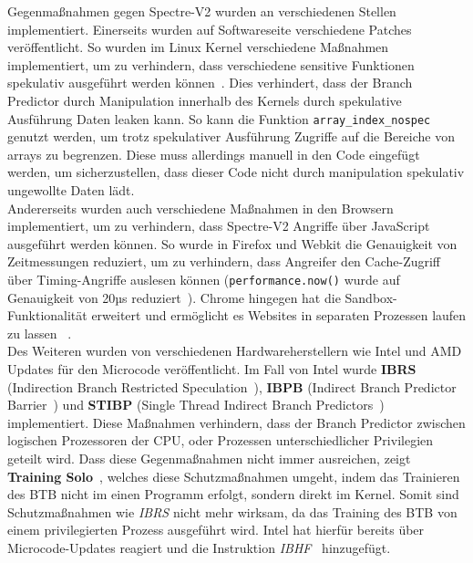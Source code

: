 Gegenmaßnahmen gegen Spectre-V2 wurden an verschiedenen Stellen implementiert.
Einerseits wurden auf Softwareseite verschiedene Patches veröffentlicht.
So wurden im Linux Kernel verschiedene Maßnahmen implementiert, um zu verhindern, dass verschiedene sensitive Funktionen spekulativ ausgeführt werden können~\cite{linux_nospec}.
Dies verhindert, dass der Branch Predictor durch Manipulation innerhalb des Kernels durch spekulative Ausführung Daten leaken kann.
So kann die Funktion \texttt{array\_index\_nospec} genutzt werden, um trotz spekulativer Ausführung Zugriffe auf die Bereiche von arrays zu begrenzen.
Diese muss allerdings manuell in den Code eingefügt werden, um sicherzustellen, dass dieser Code nicht durch manipulation spekulativ ungewollte Daten lädt.
\\
Andererseits wurden auch verschiedene Maßnahmen in den Browsern implementiert, um zu verhindern, dass Spectre-V2 Angriffe über JavaScript ausgeführt werden können.
So wurde in Firefox und Webkit die Genauigkeit von Zeitmessungen reduziert, um zu verhindern, dass Angreifer den Cache-Zugriff über Timing-Angriffe auslesen können (\texttt{performance.now()} wurde auf Genauigkeit von 20µs reduziert~\cite{luke_wagner_2018}).
Chrome hingegen hat die Sandbox-Funktionalität erweitert und ermöglicht es Websites in separaten Prozessen laufen zu lassen
~\cite{heise_2018_spec}.\\
Des Weiteren wurden von verschiedenen Hardwareherstellern wie Intel und AMD Updates für den Microcode veröffentlicht.
Im Fall von Intel wurde \textbf{IBRS} (Indirection Branch Restricted Speculation~\cite{intel_1}), \textbf{IBPB} (Indirect Branch Predictor Barrier~\cite{intel_2}) und \textbf{STIBP} (Single Thread Indirect Branch Predictors~\cite{intel_3}) implementiert.
Diese Maßnahmen verhindern, dass der Branch Predictor zwischen logischen Prozessoren der CPU, oder Prozessen unterschiedlicher Privilegien geteilt wird.
Dass diese Gegenmaßnahmen nicht immer ausreichen, zeigt \textbf{Training Solo}~\cite{training_solo}, welches diese Schutzmaßnahmen umgeht, indem das Trainieren des BTB nicht im einen Programm erfolgt, sondern direkt im Kernel.
Somit sind Schutzmaßnahmen wie \textit{IBRS} nicht mehr wirksam, da das Training des BTB von einem privilegierten Prozess ausgeführt wird.
Intel hat hierfür bereits über Microcode-Updates reagiert und die Instruktion \textit{IBHF}~\cite{darkcrizt_2025} hinzugefügt.